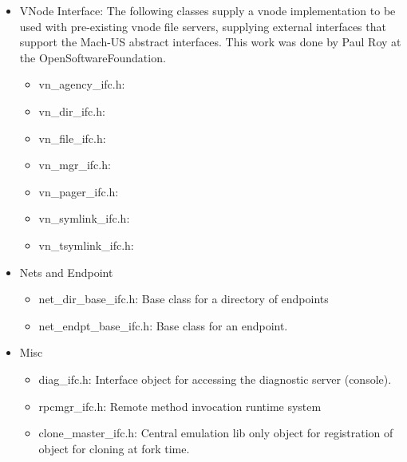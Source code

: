 \begin{itemize}
\item{VNode Interface}:
The following classes supply a vnode implementation to be used with
pre-existing vnode file servers, supplying external interfaces that
support the Mach-US abstract interfaces.  This work was done by Paul Roy
at the OpenSoftwareFoundation.
\begin{itemize}
\item{vn\_agency\_ifc.h}:
\item{vn\_dir\_ifc.h}:
\item{vn\_file\_ifc.h}:
\item{vn\_mgr\_ifc.h}:
\item{vn\_pager\_ifc.h}:
\item{vn\_symlink\_ifc.h}:
\item{vn\_tsymlink\_ifc.h}:
\end{itemize}

\item{Nets and Endpoint}
\begin{itemize}
\item{net\_dir\_base\_ifc.h}: Base class for a directory of endpoints
\item{net\_endpt\_base\_ifc.h}: Base class for an endpoint.
\end{itemize}

\item{Misc}
\begin{itemize}
\item{diag\_ifc.h}: Interface object for accessing the diagnostic
server (console).
\item{rpcmgr\_ifc.h}: Remote method invocation runtime system
\item{clone\_master\_ifc.h}: Central emulation lib only object for
registration of object for cloning at fork time.
\end{itemize}


\end{itemize}

